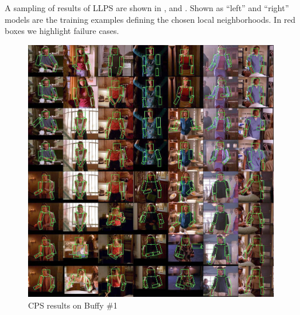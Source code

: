 A sampling of results of LLPS are shown in ,  and 
.  Shown as ``left'' and ``right'' models are the training 
examples defining the chosen local neighborhoods.  In red boxes we highlight 
failure cases.

\begin{figure}[tb]
\begin{center}
\includegraphics[width=0.99\textwidth]{figs/buffy_test_tiled_cps.jpg}
\caption[CPS results on Buffy\#1]{CPS results on Buffy \#1}
\label{fig:buffy-cps1}
\end{center}
\end{figure}

